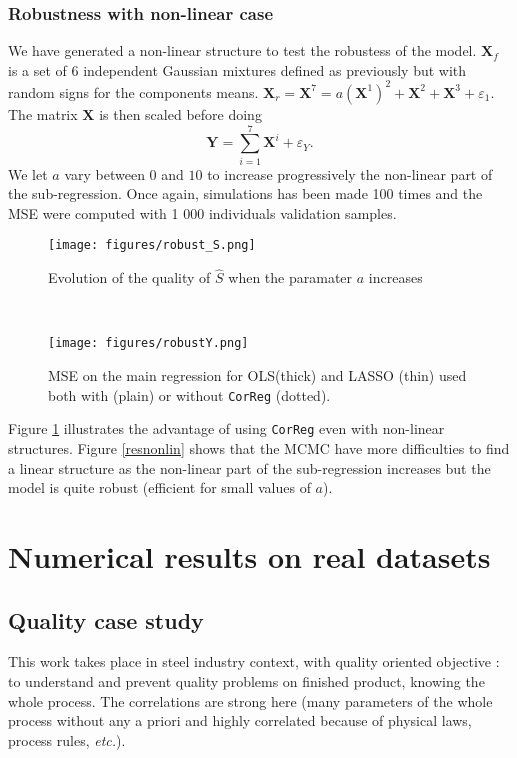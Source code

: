 \documentclass[12pt,a4paper]{report}
\begin{document}
\subsection{Robustness with non-linear case}

We have generated a non-linear structure to test the robustess of the model. $\boldsymbol{X}_f$ is a set of 6 independent Gaussian mixtures defined as previously but with random signs for the components means. $\boldsymbol{X}_r=\boldsymbol{X}^7=a(\boldsymbol{X}^1)^2+\boldsymbol{X}^2+\boldsymbol{X}^3+ \varepsilon_1$. The matrix $\boldsymbol{X}$ is then scaled before doing $$\boldsymbol{Y}=\sum_{i=1}^7\boldsymbol{X}^i+\varepsilon_Y.$$ We let $a$ vary between $0$ and $10$ to increase progressively the non-linear part of the sub-regression. Once again, simulations has been made 100 times and the MSE were computed with 1 000 individuals validation samples.

 \begin{figure}[h!] 
	\begin{minipage}[l]{.48\linewidth}
			\texttt{[image: figures/robust\_S.png]} 
			\caption{Evolution of the quality of $\hat{S}$ when the paramater $a$ increases}\label{resnonlin}
	\end{minipage} \
   \begin{minipage}[r]{.48\linewidth}
			\texttt{[image: figures/robustY.png]} 
			\caption{MSE on the main regression for OLS(thick) and LASSO (thin) used both with (plain) or without {\tt CorReg} (dotted).}\label{MSEnonlin}
   \end{minipage}
\end{figure}
Figure \ref{MSEnonlin} illustrates the advantage of using {\tt CorReg} even with non-linear structures. Figure \ref{resnonlin} shows that the MCMC have more difficulties to find a linear structure as the non-linear part of the sub-regression increases but the model is quite robust (efficient for small values of $a$).

	\FloatBarrier	
\chapter{Numerical results on real datasets} \label{sectionrealcase}
	\section{Quality case study} \label{sectionexfos}
This work takes place in steel industry context, with quality oriented objective : to understand and prevent quality problems on finished product, knowing the whole process. The correlations are strong here (many parameters of the whole process without any a priori and highly correlated because of physical laws, process rules, {\it etc.}). 
		
\end{document}
